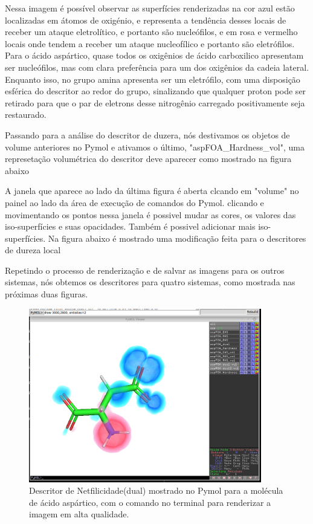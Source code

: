 \documentclass[a4paper,11pt]{refart}
\begin{document}
Nessa imagem é possível observar as superfícies renderizadas na cor azul estão localizadas em átomos de oxigénio, e representa a tendência desses locais de receber um ataque eletrolítico, e portanto são nucleófilos, e em rosa e vermelho locais onde tendem a receber um ataque nucleofílico e portanto são eletrófilos. Para o ácido aspártico, quase todos os oxigênios de ácido carboxilico apresentam ser nucleófilos, mas com clara preferência para um dos oxigênios da cadeia lateral. Enquanto isso, no grupo amina apresenta ser um eletrófilo, com uma disposição esférica do descritor ao redor do grupo, sinalizando que qualquer proton pode ser retirado para que o par de eletrons desse nitrogênio carregado positivamente seja restaurado.

Passando para a análise do descritor de duzera, nós destivamos os objetos de volume anteriores no Pymol e ativamos o último, "aspFOA_Hardness_vol", uma represetação volumétrica do descritor deve aparecer como mostrado na figura abaixo

A janela que aparece ao lado da última figura é aberta clcando em "volume" no painel ao lado da área de execução de comandos do Pymol. clicando e movimentando os pontos nessa janela é possivel mudar as cores, os valores das iso-superfícies e suas opacidades. Também é possivel adicionar mais iso-superfícies. Na figura abaixo é mostrado uma modificação feita para o descritores de dureza local

Repetindo o processo de renderização e de salvar as imagens para os outros sistemas, nós obtemos os descritores para quatro sistemas, como mostrada nas próximas duas figuras.

\hspace*{-\leftmarginwidth}
\begin{minipage}{\fullwidth}
	\begin{figure}[H]
		\begin{center}
			\includegraphics[width=4in]{images/tut4_img10}
			\caption{Descritor de Netfilicidade(dual) mostrado no Pymol para a molécula de ácido aspártico, com o comando no terminal para renderizar a imagem em alta qualidade.}
			\label{fig_tut4_8}
		\end{center}
	\end{figure}
\end{minipage}
\end{document}
